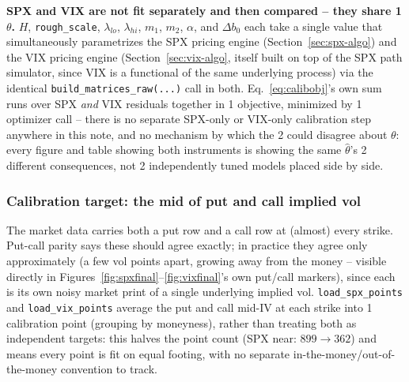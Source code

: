 \documentclass[11pt]{article}
\begin{document}
\begin{note}
\textbf{SPX and VIX are not fit separately and then compared -- they
share 1 $\theta$.} $H$, \texttt{rough\_scale}, $\lambda_{lo}$,
$\lambda_{hi}$, $m_1$, $m_2$, $\alpha$, and $\Delta b_0$ each take a
single value that simultaneously parametrizes the SPX pricing engine
(Section~\ref{sec:spx-algo}) and the VIX pricing engine
(Section~\ref{sec:vix-algo}, itself built on top of the SPX path
simulator, since VIX is a functional of the same underlying process)
via the identical \texttt{build\_matrices\_raw(...)} call in both.
Eq.~\eqref{eq:calibobj}'s own sum runs over SPX \emph{and} VIX
residuals together in 1 objective, minimized by 1 optimizer call --
there is no separate SPX-only or VIX-only calibration step anywhere
in this note, and no mechanism by which the 2 could disagree about
$\theta$: every figure and table showing both instruments is showing
the same $\hat\theta$'s 2 different consequences, not 2 independently
tuned models placed side by side.
\end{note}

\subsubsection{Calibration target: the mid of put and call implied
vol}
\label{sec:calibtarget}
The market data carries both a put row and a call row at (almost)
every strike. Put-call parity says these should agree exactly; in
practice they agree only approximately (a few vol points apart,
growing away from the money -- visible directly in
Figures~\ref{fig:spxfinal}--\ref{fig:vixfinal}'s own put/call
markers), since each is its own noisy market print of a single
underlying implied vol. \texttt{load\_spx\_points} and
\texttt{load\_vix\_points} average the put and call mid-IV at each
strike into 1 calibration point (grouping by moneyness), rather than
treating both as independent targets: this halves the point count
(SPX near: $899\to362$) and means every point is fit on equal footing,
with no separate in-the-money/out-of-the-money convention to track.
\end{document}
